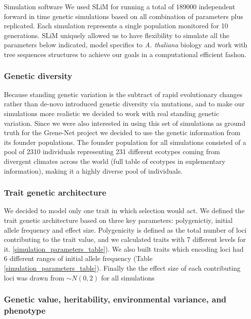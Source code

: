\documentclass{article}
\begin{document}
Simulation software
We used SLiM \citep{Haller2019-oj} for running a total of 189000 independent forward in time genetic simulations based on all combination of parameters plus replicated.  Each simulation represents a single population monitored for 10 generations. SLiM uniquely allowed us to have flexibility to simulate all the parameters below indicated, model specifics to \textit{A. thaliana} biology and work with tree sequences structures to achieve our goals in a computational efficient fashon. 

\subsubsection{Genetic diversity}
Because standing genetic variation is the subtract of rapid evolutionary changes rather than de-novo introduced genetic diversity via mutations, and to make our simulations more realistic we decided to work with real standing genetic variation. Since we were also interested in using this set of simulations as ground truth for the Grene-Net project we decided to use the genetic information from its founder populations. The founder population for all simulations consisted of a pool of 2310 individuals representing 231 different ecotypes coming from divergent climates across the world (full table of ecotypes in suplementary information), making it a highly diverse pool of individuals. 

\subsubsection{Trait genetic architecture}
We decided to model only one trait in which selection would act. We defined the trait genetic architecture based on three key parameters: polygenictiy, initial allele frequency and effect size. Polygenicity is defined as the total number of loci contributing to the trait value, and we calculated traits with 7 different levels for it. \ref{simulation_parameters_table}). We also built traits which encoding loci had 6 different ranges of initial allele frequency (Table \ref{simulation_parameters_table}). Finally the the effect size of each contributing loci was drawn from \( \sim N(0, 2) \) for all simulations

\subsubsection{Genetic value, heritability, environmental variance, and phenotype}
\end{document}
